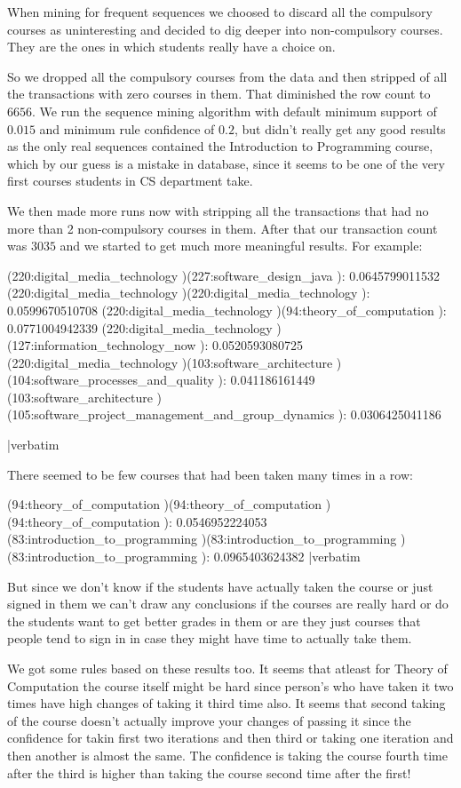When mining for frequent sequences we choosed to discard all the compulsory courses as uninteresting and
decided to dig deeper into non-compulsory courses. They are the ones in which students really have a choice on.

So we dropped all the compulsory courses from the data and then stripped of all the transactions with zero 
courses in them. That diminished the row count to $6656$. We run the sequence mining algorithm with default 
minimum support of $0.015$ and minimum rule confidence of $0.2$, but didn't really get any good results as the
only real sequences contained the Introduction to Programming course, which by our guess is a mistake in database,
since it seems to be one of the very first courses students in CS department take.

We then made more runs now with stripping all the transactions that had no more than 2 non-compulsory courses in them.
After that our transaction count was $3035$ and we started to get much more meaningful results. For example:

\verbatim
(220:digital_media_technology )(227:software_design_java ): 0.0645799011532
(220:digital_media_technology )(220:digital_media_technology ): 0.0599670510708
(220:digital_media_technology )(94:theory_of_computation ): 0.0771004942339
(220:digital_media_technology )(127:information_technology_now ): 0.0520593080725
(220:digital_media_technology )(103:software_architecture )(104:software_processes_and_quality ): 0.041186161449
(103:software_architecture )(105:software_project_management_and_group_dynamics ): 0.0306425041186

|verbatim

There seemed to be few courses that had been taken many times in a row:

\verbatim
(94:theory_of_computation )(94:theory_of_computation )(94:theory_of_computation ): 0.0546952224053
(83:introduction_to_programming )(83:introduction_to_programming )(83:introduction_to_programming ): 0.0965403624382
|verbatim

But since we don't know if the students have actually taken the course or just signed in them we can't draw any
conclusions if the courses are really hard or do the students want to get better grades in them or are they just
courses that people tend to sign in in case they might have time to actually take them. 

We got some rules based on these results too. It seems that atleast for Theory of Computation the course itself
might be hard since person's who have taken it two times have high changes of taking it third time also. It seems 
that second taking of the course doesn't actually improve your changes of passing it since the confidence for
takin first two iterations and then third or taking one iteration and then another is almost the same. The 
confidence is taking the course fourth time after the third is higher than taking the course second time 
after the first!

